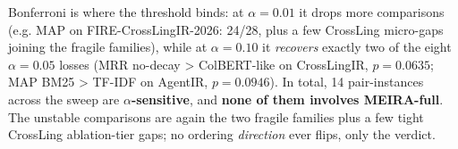 Bonferroni is where the threshold binds: at $\alpha = 0.01$ it drops more comparisons (e.g. MAP on FIRE-CrossLingIR-2026: 24/28, plus a few CrossLing micro-gaps joining the fragile families), while at $\alpha = 0.10$ it \emph{recovers} exactly two of the eight $\alpha = 0.05$ losses (MRR no-decay > ColBERT-like on CrossLingIR, $p = 0.0635$; MAP BM25 > TF-IDF on AgentIR, $p = 0.0946$). In total, 14 pair-instances across the sweep are \textbf{$\alpha$-sensitive}, and \textbf{none of them involves MEIRA-full}. The unstable comparisons are again the two fragile families plus a few tight CrossLing ablation-tier gaps; no ordering \emph{direction} ever flips, only the verdict.


%
%
%
